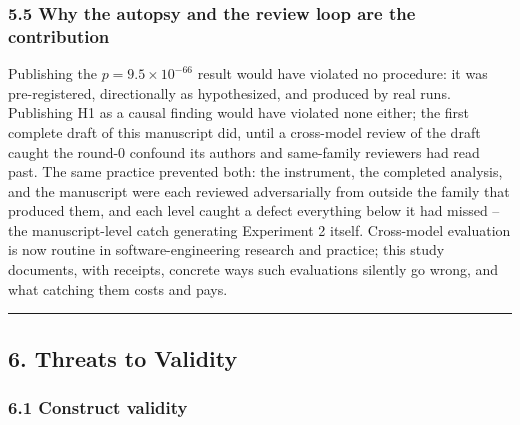\documentclass[
  11pt,
]{article}
\newcounter{none} %
\begin{document}
\subsubsection{5.5 Why the autopsy and the review loop are the
contribution}\label{why-the-autopsy-and-the-review-loop-are-the-contribution}

Publishing the $p = 9.5 \times 10^{-66}$ result would have violated no
procedure: it was pre-registered, directionally as hypothesized, and
produced by real runs. Publishing H1 as a causal finding would have
violated none either; the first complete draft of this manuscript did,
until a cross-model review of the draft caught the round-0 confound its
authors and same-family reviewers had read past. The same practice
prevented both: the instrument, the completed analysis, and the
manuscript were each reviewed adversarially from outside the family that
produced them, and each level caught a defect everything below it had
missed -- the manuscript-level catch generating Experiment 2 itself.
Cross-model evaluation is now routine in software-engineering research
and practice; this study documents, with receipts, concrete ways such
evaluations silently go wrong, and what catching them costs and pays.

\begin{center}\rule{0.5\linewidth}{0.5pt}\end{center}

\subsection{6. Threats to Validity}\label{threats-to-validity}

\subsubsection{6.1 Construct validity}\label{construct-validity}
\end{document}
